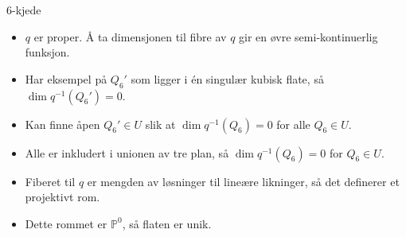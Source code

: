 \documentclass[UKenglish,aspectratio=169]{beamer}
\begin{document}
\begin{frame}[fragile]{6-kjede}
    \begin{figure}[ht]
        \centering
    \end{figure}

    \begin{itemize}
        \item $q$ er proper. Å ta dimensjonen til fibre av $q$ gir en øvre semi-kontinuerlig funksjon.
        \item Har eksempel på $Q_6'$ som ligger i én singulær kubisk flate, så 
        $\dim q^{-1}(Q_6') = 0$.
        \item Kan finne åpen $Q_6' \in U$ slik at $\dim q^{-1}(Q_6) = 0$ for alle $Q_6 \in U$.
        \item Alle er inkludert i unionen av tre plan, så $\dim q^{-1}(Q_6) = 0$ for $Q_6 \in U$.
        \item Fiberet til $q$ er mengden av løsninger til lineære likninger, så det definerer et projektivt rom.
        \item Dette rommet er $\mathbb{P}^0$, så flaten er unik.
    \end{itemize}
\end{frame}

\begin{frame}
    
\end{frame}
\end{document}
